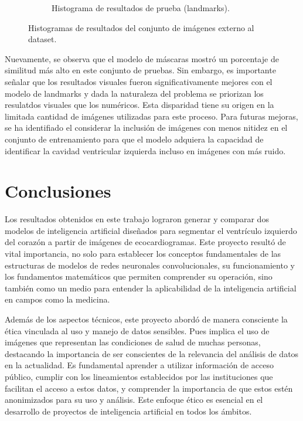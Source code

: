 \documentclass[runningheads]{llncs}
\begin{document}
\begin{figure}
\begin{subfigure}{0.45\linewidth}
        \caption{Histograma de resultados de prueba (landmarks).}
    \end{subfigure}
    \caption{Histogramas de resultados del conjunto de imágenes externo al dataset.}
\end{figure}

Nuevamente, se observa que el modelo de máscaras mostró un porcentaje de similitud más alto en este conjunto de pruebas. Sin embargo, es importante señalar que los resultados visuales fueron significativamente mejores con el modelo de landmarks y dada la naturaleza del problema se priorizan los resulatdos visuales que los numéricos. Esta disparidad tiene su origen en la limitada cantidad de imágenes utilizadas para este proceso. Para futuras mejoras, se ha identifiado el considerar la inclusión de imágenes con menos nitidez en el conjunto de entrenamiento para que el modelo adquiera la capacidad de identificar la cavidad ventricular izquierda incluso en imágenes con más ruido.

\section{Conclusiones}

Los resultados obtenidos en este trabajo lograron generar y comparar dos modelos de inteligencia artificial diseñados para segmentar el ventrículo izquierdo del corazón a partir de imágenes de ecocardiogramas. Este proyecto resultó de vital importancia, no solo para establecer los conceptos fundamentales de las estructuras de modelos de redes neuronales convolucionales, su funcionamiento y los fundamentos matemáticos que permiten comprender su operación, sino también como un medio para entender la aplicabilidad de la inteligencia artificial en campos como la medicina.

Además de los aspectos técnicos, este proyecto abordó de manera consciente la ética vinculada al uso y manejo de datos sensibles. Pues implica el uso de imágenes que representan las condiciones de salud de muchas personas, destacando la importancia de ser conscientes de la relevancia del análisis de datos en la actualidad. Es fundamental aprender a utilizar información de acceso público, cumplir con los lineamientos establecidos por las instituciones que facilitan el acceso a estos datos, y comprender la importancia de que estos estén anonimizados para su uso y análisis. Este enfoque ético es esencial en el desarrollo de proyectos de inteligencia artificial en todos los ámbitos.
\end{document}
